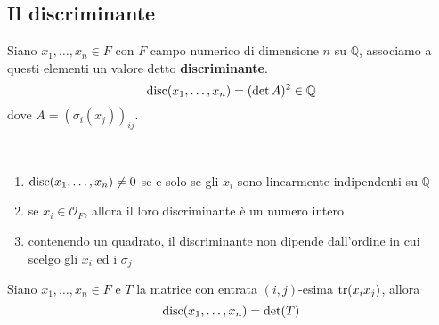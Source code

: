 \subsection{Il discriminante}
\begin{definizione}[Discriminante]
	Siano $x_1,\dots,x_n\in F$ con $F$ campo numerico di dimensione $n$ su $\mathbb{Q}$, associamo a questi elementi un valore detto \textbf{discriminante}.
	\begin{equation*}
	\operatorname{disc}(x_1,\dots,x_n)=(\det A)^2\in\mathbb{Q}
	\end{equation*}
	dove $A=\left(\sigma_i(x_j)\right)_{ij}$.
\end{definizione}
\begin{proposizione}\
	\begin{enumerate}
		\item $\operatorname{disc}(x_1,\dots,x_n)\neq0$ se e solo se gli $x_i$ sono linearmente indipendenti su $\mathbb{Q}$
		\item se $x_i\in \mathcal{O}_F$, allora il loro discriminante è un numero intero
		\item contenendo un quadrato, il discriminante non dipende dall'ordine in cui scelgo gli $x_i$ ed i $\sigma_j$
	\end{enumerate}
\end{proposizione}
\begin{proposizione}
	Siano $x_1,\dots,x_n\in F$ e $T$ la matrice con entrata $(i,j)$-esima $\operatorname{tr}(x_ix_j)$, allora
	\begin{equation*}
	\operatorname{disc}(x_1,\dots,x_n)=\det(T)
	\end{equation*}
\end{proposizione}
